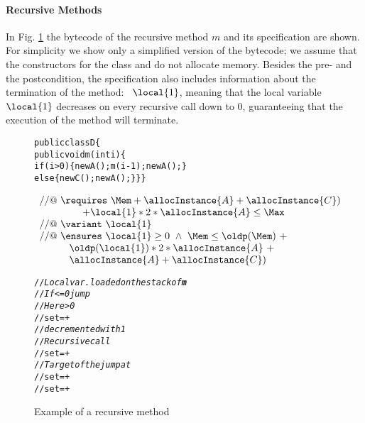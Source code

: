 \paragraph{Recursive Methods} In Fig. \ref{recMeth} the bytecode
of the recursive method $m$ and its specification are shown. For
simplicity we show only a simplified version of the bytecode; we
assume that the constructors for the class  and 
do not allocate memory. Besides the pre- and the postcondition, the
specification also includes information about the termination of the
method: \variant\ $\local{1}$, meaning that the local variable
$\local{1}$ decreases on every recursive call down to $0$, guaranteeing 
that the execution of the method will terminate.

 

\begin{figure}[!t]
\begin{alltt}
public class D \{
 public void m (int i) \{
   if (i > 0) \{ new A(); m(i-1); new A(); \}
   else \{ new C(); new A(); \} \} \}
\end{alltt}
$$
\begin{array}{l}
 //@ \ \requires \ \Mem + \allocInstance{A} + \allocInstance{C}) \\
\ \ \ \ \ \ \ \ \ \ \ \ \  + \local{1}*2*\allocInstance{A} \le \Max \\
//@ \ \variant \ \local{1} \\
//@ \  \ensures  \ \local{1} \ge 0 \ \wedge \ \Mem \leq \oldp(\Mem)\ +  \\
\ \ \ \ \ \ \ \ \ \oldp(\local{1})*2*\allocInstance{A}\ + \\
\ \ \ \ \ \ \ \ \ \allocInstance{A} +  \allocInstance{C})
\end{array}$$

\begin{alltt}
 //\small{\textit{Local var. loaded on the stack of \textbf{m}}}
 //\small{\textit{If  <= 0 jump}}
 //\small{\textit{Here  > 0  } }
//set \Mem = \Mem + 
 //\small{\textit{ decremented with 1}}
 //\small{\textit{Recursive call}}
//set \Mem = \Mem + 
 //\small{\textit{Target of the jump at }}
//set \Mem = \Mem +  
//set \Mem = \Mem + 
\end{alltt}

\caption{\sc Example of a recursive method}
 \label{recMeth}
\end{figure}

